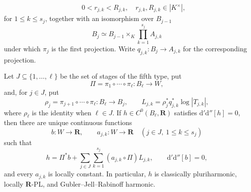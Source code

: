 \begin{theorem}
\begin{enumerate}
\[\begin{gathered}
 \qquad 0<r_{j,k}<R_{j,k},\quad r_{j,k},R_{j,k}\in|K^\times|,
 \end{gathered}
\]
for $1\leq k\leq s_j$, together with an isomorphism over $B_{j-1}$
\[
 B_j\simeq B_{j-1}\times_K\prod_{k=1}^{s_j}A_{j,k}
\]
under which $\pi_j$ is the first projection.  Write
$q_{j,k}:B_j\to A_{j,k}$ for the corresponding projection.
\end{enumerate}
Let $J\subseteq\{1,\ldots,\ell\}$ be the set of stages of the fifth
type, put
\[
 \Pi=\pi_1\circ\cdots\circ\pi_\ell:B_\ell\longrightarrow W,
\]
and, for $j\in J$, put
\[
 \rho_j=\pi_{j+1}\circ\cdots\circ\pi_\ell:B_\ell\longrightarrow B_j,
 \qquad
 L_{j,k}=\rho_j^*q_{j,k}^*\log|T_{j,k}|,
\]
where $\rho_\ell$ is the identity when $\ell\in J$.  If
$h\in C^0(B_\ell,\mathbf R)$ satisfies
$\mathrm d'\mathrm d''[h]=0$, then there are unique continuous functions
\[
 b:W\to\mathbf R,
 \qquad a_{j,k}:W\to\mathbf R\quad(j\in J,\ 1\leq k\leq s_j)
\]
such that
\[
 h=\Pi^*b+
   \sum_{j\in J}\sum_{k=1}^{s_j}(a_{j,k}\circ\Pi)L_{j,k},
 \qquad \mathrm d'\mathrm d''[b]=0,
\]
and every $a_{j,k}$ is locally constant.  In particular, $h$ is
classically pluriharmonic, locally $\mathbf R$-PL, and
Gubler--Jell--Rabinoff harmonic.
\end{theorem}
